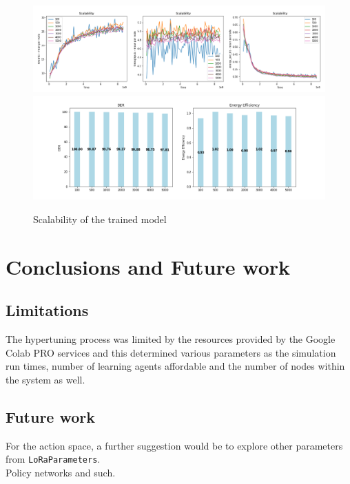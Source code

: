 \begin{figure}[H]
\centering
\hspace*{-2.3cm}  
\includegraphics[scale=0.45]{plots/scalability/scalability_small.png}\\
\hspace*{-1.3cm}  
\includegraphics[scale=0.45]{plots/scalability/scalability_histogram.png}
  \caption{Scalability of the trained model}
  \label{fig:scalability_small}
\end{figure}


\chapter{Conclusions and Future work}

\section{Limitations}
The hypertuning process was limited by the resources provided by the 
Google Colab PRO services and this determined various parameters 
as the simulation run times, number of learning agents affordable and the number of nodes within the system as well.

\section{Future work}
For the action space, a further suggestion would be to explore other parameters from \texttt{LoRaParameters}.\\

Policy networks and such.



